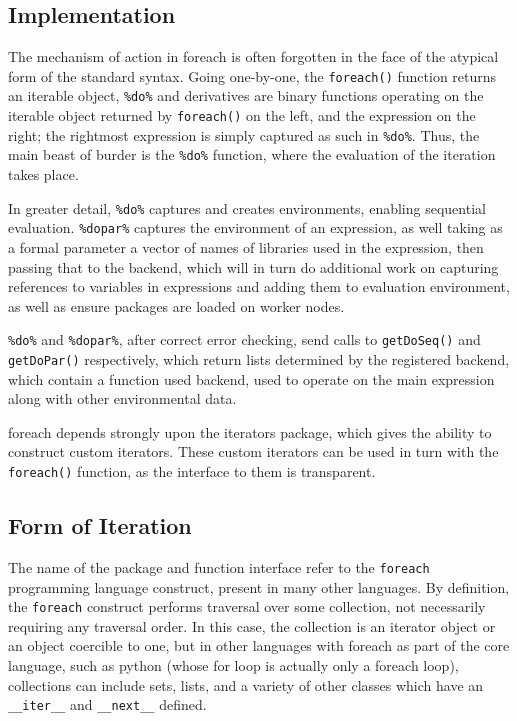 \documentclass[a4paper,10pt]{article}
\begin{document}
\subsection{Implementation}
\label{sec:implementation}

The mechanism of action in foreach is often forgotten in the face of
the atypical form of the standard syntax. Going one-by-one, the
\texttt{foreach()} function returns an iterable object,
\texttt{\%do\%} and derivatives are binary functions operating on the
iterable object returned by \texttt{foreach()} on the left, and the
expression on the right; the rightmost expression is simply captured
as such in \texttt{\%do\%}. Thus, the main beast of burder is the
\texttt{\%do\%} function, where the evaluation of the iteration takes
place.

In greater detail, \texttt{\%do\%} captures and creates environments, enabling
sequential evaluation. \texttt{\%dopar\%} captures the environment of an
expression, as well taking as a formal parameter a vector of names of libraries
used in the expression, then passing that to the backend, which will in turn do
additional work on capturing references to variables in expressions and adding
them to evaluation environment, as well as ensure packages are loaded on worker
nodes.

\texttt{\%do\%} and \texttt{\%dopar\%}, after correct error checking,
send calls to \texttt{getDoSeq()} and \texttt{getDoPar()}
respectively, which return lists determined by the registered backend,
which contain a function used backend, used to operate on the main
expression along with other environmental data.

foreach depends strongly upon the iterators package, which gives the
ability to construct custom iterators. These custom iterators can be
used in turn with the \texttt{foreach()} function, as the interface to
them is transparent.

\subsection{Form of Iteration}\label{sec:form-iter}

The name of the package and function interface refer to the \texttt{foreach}
programming language construct, present in many other languages.
By definition, the \texttt{foreach} construct performs traversal over some
collection, not necessarily requiring any traversal order.
In this case, the collection is an iterator object or an object coercible to
one, but in other languages with foreach as part of the core language, such as
python (whose for loop is actually only a foreach loop), collections can
include sets, lists, and a variety of other classes which have an
\texttt{\_\_iter\_\_} and \texttt{\_\_next\_\_} defined\cite{python2020iter}.
\end{document}
